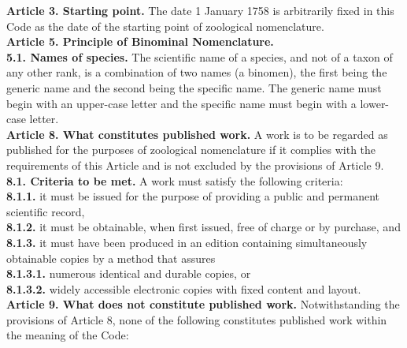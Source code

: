 \documentclass[letterpaper, 11pt]{article}
\begin{document}
\noindent{}\textbf{Article 3. Starting point.} The date 1 January 1758 is arbitrarily fixed in this Code as the date of the starting point of zoological nomenclature.\\

\noindent{}\textbf{Article 5. Principle of Binominal Nomenclature.}\\
\noindent{}\textbf{5.1. Names of species.} The scientific name of a species, and not of a taxon of any other rank, is a combination of two names (a binomen), the first being the generic name and the second being the specific name. The generic name must begin with an upper-case letter and the specific name must begin with a lower-case letter.\\

\noindent{}\textbf{Article 8. What constitutes published work.} A work is to be regarded as published for the purposes of zoological nomenclature if it complies with the requirements of this Article and is not excluded by the provisions of Article 9.\\
\noindent{}\textbf{8.1. Criteria to be met.} A work must satisfy the following criteria:\\
\noindent{}\textbf{8.1.1.} it must be issued for the purpose of providing a public and permanent scientific record,\\
\noindent{}\textbf{8.1.2.} it must be obtainable, when first issued, free of charge or by purchase, and\\
\noindent{}\textbf{8.1.3.} it must have been produced in an edition containing simultaneously obtainable copies by a method that assures\\
\noindent{}\textbf{8.1.3.1.} numerous identical and durable copies, or\\
\noindent{}\textbf{8.1.3.2.} widely accessible electronic copies with fixed content and layout.\\

\noindent{}\textbf{Article 9. What does not constitute published work.} Notwithstanding the provisions of Article 8, none of the following constitutes published work within the meaning of the Code:
\end{document}
